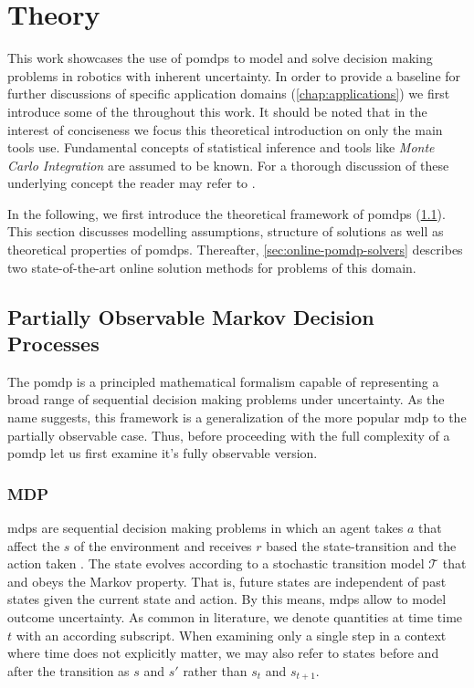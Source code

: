 \chapter{Theory}

This work showcases the use of \glspl{pomdp} to model and solve decision making
problems in robotics with inherent uncertainty. In order to provide a baseline
for further discussions of specific application domains
(\cref{chap:applications}) we first introduce some of the throughout this work.
It should be noted that in the interest of conciseness we focus this
theoretical introduction on only the main tools use. Fundamental concepts of
statistical inference and tools like \textit{Monte Carlo Integration} are
assumed to be known. For a thorough discussion of these underlying concept the
reader may refer to \cite{kochenderfer2015decision, bertsekas2005dynamic, probRobotics}.

In the following, we first introduce the theoretical framework of \glspl{pomdp}
(\cref{sec:pomdp}). This section discusses modelling assumptions, structure
of solutions as well as theoretical properties of \glspl{pomdp}. Thereafter,
\cref{sec:online-pomdp-solvers} describes two state-of-the-art online solution
methods for problems of this domain.

\section{Partially Observable Markov Decision Processes}\label{sec:pomdp}

The \acf{pomdp} is a principled mathematical formalism capable of representing
a broad range of sequential decision making problems under uncertainty. As the
name suggests, this framework is a generalization of the more popular \ac{mdp}
to the partially observable case. Thus, before proceeding with the full
complexity of a \ac{pomdp} let us first examine it's fully observable version.

\subsection{MDP}

\glspl{mdp} are sequential decision making problems in which an agent takes
 $a$ that affect the  $s$ of the environment and
receives  $r$ based the state-transition and the action taken
\cite{kochenderfer2015decision, bertsekas2005dynamic}. The state evolves
according to a stochastic transition model $\mathcal{T}$ that and obeys the
Markov property. That is, future states are independent of past states given
the current state and action. By this means, \glspl{mdp} allow to model outcome
uncertainty. As common in literature, we denote quantities at time time $t$
with an according subscript. When examining only a single step in a context
where time does not explicitly matter, we may also refer to states before and
after the transition as $s$ and $s'$ rather than $s_t$ and $s_{t+1}$.

